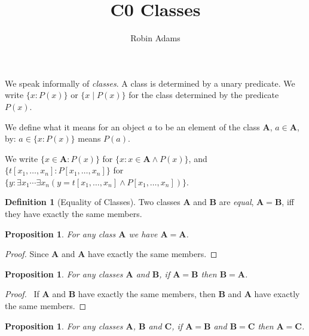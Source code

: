 \documentclass{article}
\title{C0 Classes}
\author{Robin Adams}
\newtheorem{proposition}[axiom]{Proposition}
\theoremstyle{definition}
\newtheorem{definition}[axiom]{Definition}
\begin{document}
    \maketitle

    We speak informally of \emph{classes}. A class is determined by a unary predicate. We write 
    $\{ x : P(x) \}$ or $\{ x \mid P(x) \}$ for the class determined by the predicate $P(x)$.

    We define what it means for an object $a$ to be an element of the class $\mathbf{A}$, $a \in \mathbf{A}$,
    by: $a \in \{ x : P(x) \}$ means $P(a)$.

    We write $\{ x \in \mathbf{A} : P(x) \}$ for $\{ x : x \in \mathbf{A} \wedge P(x) \}$,
    and $\{ t[x_1, \ldots, x_n] : P[x_1, \ldots, x_n] \}$ for $\{ y : \exists x_1 \cdots \exists x_n
    (y = t[x_1, \ldots, x_n] \wedge P[x_1, \ldots, x_n]) \}$.

    \begin{definition}[Equality of Classes]
        Two classes $\mathbf{A}$ and $\mathbf{B}$ are \emph{equal}, $\mathbf{A} = \mathbf{B}$,
        iff they have exactly the same members.
    \end{definition}

    \begin{proposition}
        For any class $\mathbf{A}$ we have $\mathbf{A} = \mathbf{A}$.
    \end{proposition}

    \begin{proof}
        Since $\mathbf{A}$ and $\mathbf{A}$ have exactly the same members.
    \end{proof}

    \begin{proposition}
        For any classes $\mathbf{A}$ and $\mathbf{B}$, if $\mathbf{A} = \mathbf{B}$ then $\mathbf{B} =
        \mathbf{A}$.
    \end{proposition}

    \begin{proof}
        \pf\ If $\mathbf{A}$ and $\mathbf{B}$ have exactly the same members, then $\mathbf{B}$
        and $\mathbf{A}$ have exactly the same members.
    \end{proof}

    \begin{proposition}
        For any classes $\mathbf{A}$, $\mathbf{B}$ and $\mathbf{C}$, if $\mathbf{A} = \mathbf{B}$
        and $\mathbf{B} = \mathbf{C}$ then $\mathbf{A} = \mathbf{C}$.
    \end{proposition}
\end{document}
